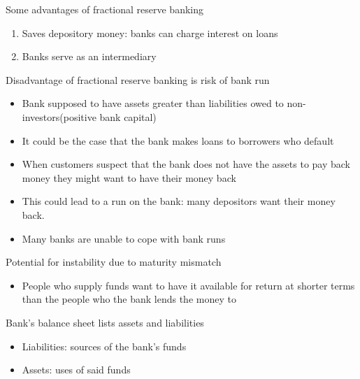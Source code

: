 \documentclass{beamer}
\begin{document}
\begin{frame}
 Some advantages of fractional reserve banking
\begin{enumerate}
  \item Saves depository money: banks can charge interest on loans
  \item Banks serve as an intermediary  
\end{enumerate}
\end{frame}

\begin{frame}
 Disadvantage of fractional reserve banking is risk of bank run  
\begin{itemize}
  \item Bank supposed to have assets greater than liabilities owed to non-investors(positive bank capital)
  \item It could be the case that the bank makes loans to borrowers who default
  \item When customers suspect that the bank does not have the assets to pay back money they might want to have their money back
  \item This could lead to a run on the bank: many depositors want their money back. 
  \item Many banks are unable to cope with bank runs
\end{itemize}
 \medskip
 Potential for instability due to maturity mismatch
 \begin{itemize}
   \item People who supply funds want to have it available for return at shorter terms than the people who the bank lends the money to
 \end{itemize}
\end{frame}

\begin{frame}
 Bank's balance sheet lists assets and liabilities  
\begin{itemize}
  \item Liabilities: sources of the bank's funds
  \item Assets: uses of said funds
\end{itemize}
\end{frame}
\end{document}

